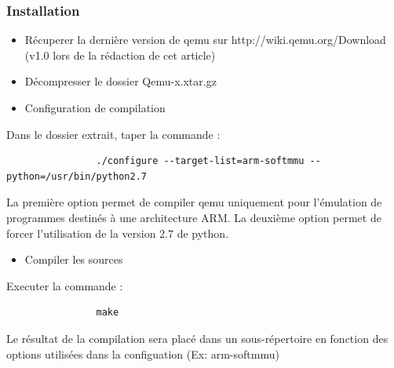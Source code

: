 \documentclass{article}
\begin{document}
		\subsubsection{Installation}
			 \begin{itemize}
				\item Récuperer la dernière version de qemu sur http://wiki.qemu.org/Download (v1.0 lors de la rédaction de cet article) 
				\item Décompresser le dossier Qemu-x.xtar.gz 
				\item Configuration de compilation 
			\end{itemize}
			Dans le dossier extrait, taper la commande : 
			\begin{verbatim}
				./configure --target-list=arm-softmmu --python=/usr/bin/python2.7
			\end{verbatim}
			La première option permet de compiler qemu uniquement pour l'émulation de programmes destinés à une architecture ARM. La deuxième 
			option permet de forcer l'utilisation de la version 2.7 de python. 
			 \begin{itemize}
				\item Compiler les sources 
			\end{itemize}
			Executer la commande :
			\begin{verbatim}
				make
			\end{verbatim}
			Le résultat de la compilation sera placé dans un sous-répertoire en fonction des options utilisées dans la configuation 
			(Ex: arm-softmmu) 
			
\end{document}
